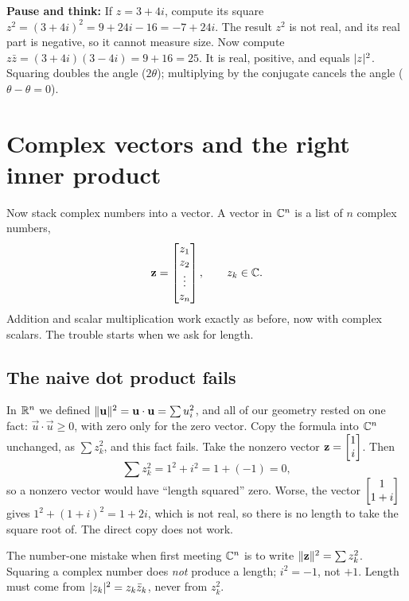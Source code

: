\begin{recoverybox}
\textbf{Pause and think:} If $z = 3 + 4i$, compute its square $z^2 = (3+4i)^2 = 9 + 24i - 16 = -7 + 24i$.
The result $z^2$ is not real, and its real part is negative, so it cannot measure size.
Now compute $z\bar z = (3+4i)(3-4i) = 9 + 16 = 25$. It is real, positive, and equals $\lvert z\rvert^2$.
Squaring doubles the angle ($2\theta$); multiplying by the conjugate cancels the angle ($\theta - \theta = 0$).
\end{recoverybox}

\section{Complex vectors and the right inner product}

Now stack complex numbers into a vector. A vector in $\mathbb{C}^n$ is a list of $n$
complex numbers,
\[
  \mathbf{z} = \begin{bmatrix}z_1 \\ z_2 \\ \vdots \\ z_n\end{bmatrix}, \qquad z_k\in\mathbb{C}.
\]
Addition and scalar multiplication work exactly as before, now with complex
scalars. The trouble starts when we ask for length.

\subsection{The naive dot product fails}

In $\mathbb{R}^n$ we defined $\lVert\mathbf{u}\rVert^2 = \mathbf{u}\cdot\mathbf{u} = \sum u_i^2$, and all
of our geometry rested on one fact: $\vec u\cdot\vec u \ge 0$, with zero only
for the zero vector. Copy the formula into $\mathbb{C}^n$ unchanged, as $\sum z_k^2$, and
this fact fails. Take the nonzero vector $\mathbf{z} = \begin{bmatrix}1 \\ i\end{bmatrix}$. Then
\[
  \sum z_k^2 = 1^2 + i^2 = 1 + (-1) = 0,
\]
so a nonzero vector would have ``length squared'' zero. Worse, the
vector $\begin{bmatrix}1\\1+i\end{bmatrix}$ gives $1^2 + (1+i)^2 = 1 + 2i$, which is not real, so
there is no length to take the square root of. The direct copy does not work.

\begin{trapbox}
The number-one mistake when first meeting $\mathbb{C}^n$ is to write $\lVert\mathbf{z}\rVert^2 =
\sum z_k^2$. Squaring a complex number does \emph{not} produce a length; $i^2=-1$,
not $+1$. Length must come from $\lvert z_k\rvert^2 = z_k\bar z_k$, never from $z_k^2$.
\end{trapbox}

